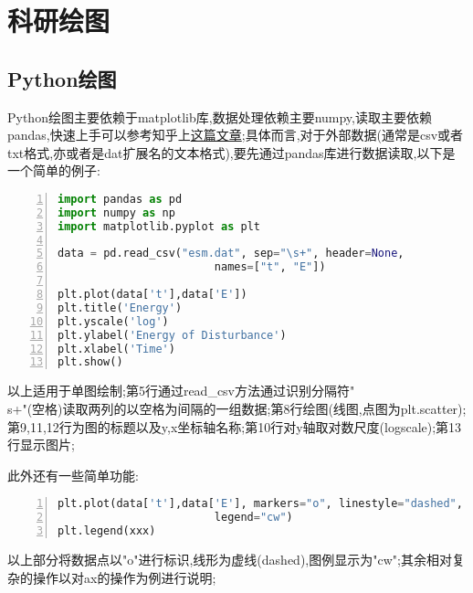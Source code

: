 \chapter{科研绘图}

\section{Python绘图}
Python绘图主要依赖于matplotlib库,数据处理依赖主要numpy,读取主要依赖pandas,快速上手可以参考知乎上\href{https://zhuanlan.zhihu.com/p/70835617}{这篇文章};具体而言,对于外部数据(通常是csv或者txt格式,亦或者是dat扩展名的文本格式),要先通过pandas库进行数据读取,以下是一个简单的例子:\par

\begin{lstlisting}[numbers=left,frame=single,language=Python]
import pandas as pd
import numpy as np
import matplotlib.pyplot as plt

data = pd.read_csv("esm.dat", sep="\s+", header=None,
					    names=["t", "E"])

plt.plot(data['t'],data['E'])
plt.title('Energy')
plt.yscale('log')
plt.ylabel('Energy of Disturbance')
plt.xlabel('Time')
plt.show()

\end{lstlisting}
\par
以上适用于单图绘制;第5行通过read\_csv方法通过识别分隔符"\\s+"(空格)读取两列的以空格为间隔的一组数据;第8行绘图(线图,点图为plt.scatter);第9,11,12行为图的标题以及y,x坐标轴名称;第10行对y轴取对数尺度(logscale);第13行显示图片;\par

此外还有一些简单功能:\par
\begin{lstlisting}[numbers=left,frame=single,language=Python]
plt.plot(data['t'],data['E'], markers="o", linestyle="dashed",
					    legend="cw")
plt.legend(xxx)
\end{lstlisting}
\par
以上部分将数据点以"o"进行标识,线形为虚线(dashed),图例显示为"cw";其余相对复杂的操作以对ax的操作为例进行说明;\par

